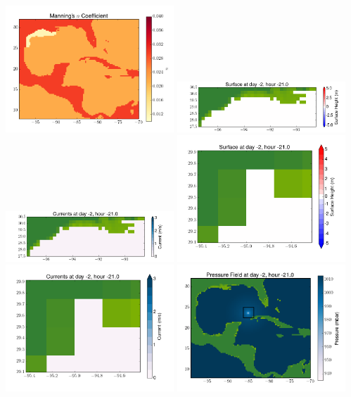 \documentclass[11pt]{article}
\begin{document}
\vskip 10pt 
\includegraphics[width=0.475\textwidth]{frame0003fig3.png}
\includegraphics[width=0.475\textwidth]{frame0003fig4.png}
\vskip 10pt 
\includegraphics[width=0.475\textwidth]{frame0003fig5.png}
\includegraphics[width=0.475\textwidth]{frame0003fig6.png}
\vskip 10pt 
\includegraphics[width=0.475\textwidth]{frame0003fig7.png}
\includegraphics[width=0.475\textwidth]{frame0003fig8.png}
\end{document}
